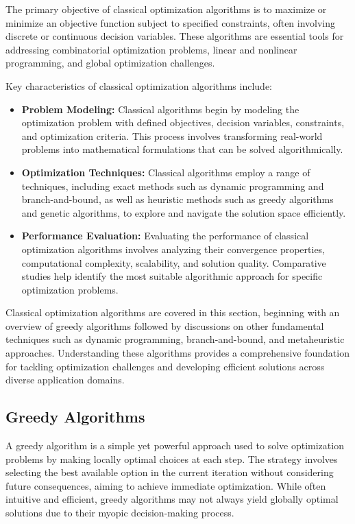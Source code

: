 \documentclass[11pt]{report}
\begin{document}
    The primary objective of classical optimization algorithms is to maximize or minimize an objective function subject to specified constraints, often involving discrete or continuous decision variables. These algorithms are essential tools for addressing combinatorial optimization problems, linear and nonlinear programming, and global optimization challenges.
    
    Key characteristics of classical optimization algorithms include:
    \begin{itemize}
        \item \textbf{Problem Modeling:} Classical algorithms begin by modeling the optimization problem with defined objectives, decision variables, constraints, and optimization criteria. This process involves transforming real-world problems into mathematical formulations that can be solved algorithmically.
    
        \item \textbf{Optimization Techniques:} Classical algorithms employ a range of techniques, including exact methods such as dynamic programming and branch-and-bound, as well as heuristic methods such as greedy algorithms and genetic algorithms, to explore and navigate the solution space efficiently.
    
        \item \textbf{Performance Evaluation:} Evaluating the performance of classical optimization algorithms involves analyzing their convergence properties, computational complexity, scalability, and solution quality. Comparative studies help identify the most suitable algorithmic approach for specific optimization problems.
    \end{itemize}
    
    Classical optimization algorithms are covered in this section, beginning with an overview of greedy algorithms followed by discussions on other fundamental techniques such as dynamic programming, branch-and-bound, and metaheuristic approaches. Understanding these algorithms provides a comprehensive foundation for tackling optimization challenges and developing efficient solutions across diverse application domains.

        \subsection{Greedy Algorithms}
        A greedy algorithm is a simple yet powerful approach used to solve optimization problems by making locally optimal choices at each step. The strategy involves selecting the best available option in the current iteration without considering future consequences, aiming to achieve immediate optimization. While often intuitive and efficient, greedy algorithms may not always yield globally optimal solutions due to their myopic decision-making process.
\end{document}
